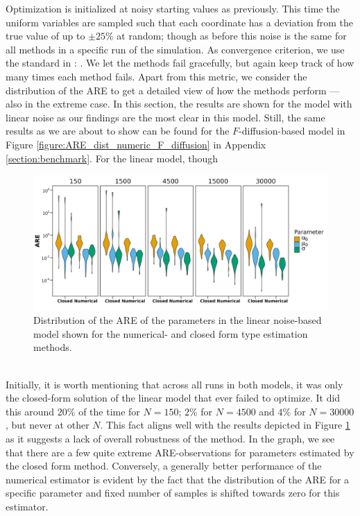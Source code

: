 Optimization is initialized at noisy starting values as previously. This time the uniform variables are sampled such that each coordinate has a deviation from the true value of up to $\pm 25\%$ at random; though as before this noise is the same for all methods in a specific run of the simulation. As convergence criterion, we use the standard in : . We let the methods fail gracefully, but again keep track of how many times each method fails. Apart from this metric, we consider the distribution of the ARE to get a detailed view of how the methods perform — also in the extreme case. In this section, the results are shown for the model with linear noise as our findings are the most clear in this model. Still, the same results as we are about to show can be found for the $F$-diffusion-based model in Figure \ref{figure:ARE_dist_numeric_F_diffusion} in Appendix \ref{section:benchmark}. For the linear model, though
\begin{figure}[h!]
\begin{center}
    \includegraphics[scale = .1]{figures/ARE_dist_result_plot_Linear.jpeg}
    \caption{Distribution of the ARE of the parameters in the linear noise-based model shown for the numerical- and closed form type estimation methods.}
    \label{figure:ARE_dist_linear_noise}
\end{center}
\end{figure}\\
Initially, it is worth mentioning that across all runs in both models, it was only the closed-form solution of the linear model that ever failed to optimize. It did this around $20\%$ of the time for $N = 150$; $2\%$ for $N = 4500$ and $4\%$ for $N = 30000$, but never at other $N$. This fact aligns well with the results depicted in Figure \ref{figure:ARE_dist_linear_noise} as it suggests a lack of overall robustness of the method. In the graph, we see that there are a few quite extreme ARE-observations for parameters estimated by the closed form method. Conversely, a generally better performance of the numerical estimator is evident by the fact that the distribution of the ARE for a specific parameter and fixed number of samples is shifted towards zero for this estimator. 

